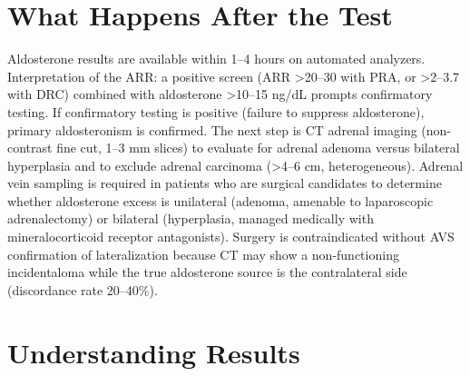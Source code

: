 \section*{What Happens After the Test}
Aldosterone results are available within 1--4 hours on automated analyzers. Interpretation of the ARR: a positive screen (ARR >20--30 with PRA, or >2--3.7 with DRC) combined with aldosterone >10--15 ng/dL prompts confirmatory testing. If confirmatory testing is positive (failure to suppress aldosterone), primary aldosteronism is confirmed. The next step is CT adrenal imaging (non-contrast fine cut, 1--3 mm slices) to evaluate for adrenal adenoma versus bilateral hyperplasia and to exclude adrenal carcinoma (>4--6 cm, heterogeneous). Adrenal vein sampling is required in patients who are surgical candidates to determine whether aldosterone excess is unilateral (adenoma, amenable to laparoscopic adrenalectomy) or bilateral (hyperplasia, managed medically with mineralocorticoid receptor antagonists). Surgery is contraindicated without AVS confirmation of lateralization because CT may show a non-functioning incidentaloma while the true aldosterone source is the contralateral side (discordance rate 20--40\%).

\section*{Understanding Results}

